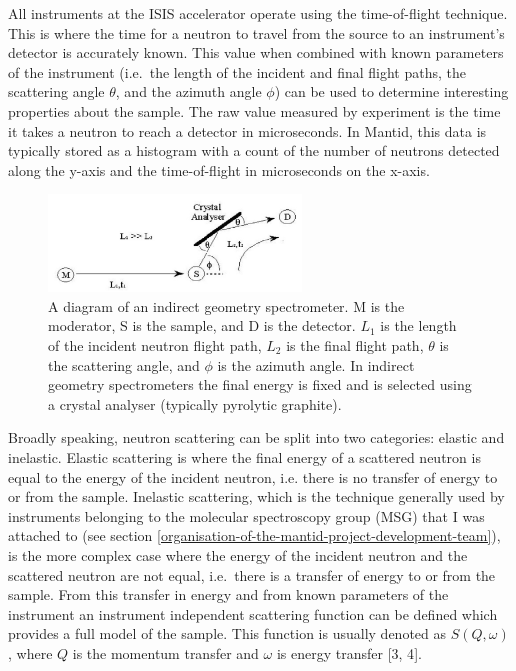 \documentclass[paper=a4, fontsize=11pt]{scrartcl}	%
\numberwithin{equation}{section}															%
\numberwithin{figure}{section}																%
\numberwithin{table}{section}
\begin{document}
All instruments at the ISIS accelerator operate using the time-of-flight
technique. This is where the time for a neutron to travel from the
source to an instrument's detector is accurately known. This value when
combined with known parameters of the instrument (i.e.~the length of the
incident and final flight paths, the scattering angle $\theta$, and the
azimuth angle $\phi$) can be used to determine interesting properties
about the sample. The raw value measured by experiment is the time it
takes a neutron to reach a detector in microseconds. In Mantid, this
data is typically stored as a histogram with a count of the number of
neutrons detected along the y-axis and the time-of-flight in
microseconds on the x-axis.

\begin{figure}[H]
\centering
\includegraphics[width=0.6\textwidth]{img/instrument-diagram.png}
\caption{A diagram of an indirect geometry spectrometer. M is the moderator, S is the sample, and D is the detector. $L_1$ is the length of the incident neutron flight path, $L_2$ is the final flight path, $\theta$ is the scattering angle, and $\phi$ is the azimuth angle. In indirect geometry spectrometers the final energy is fixed and is selected using a crystal analyser (typically pyrolytic graphite).}
\label{fig:instrument-diagram}
\end{figure}

Broadly speaking, neutron scattering can be split into two categories:
elastic and inelastic. Elastic scattering is where the final energy of a
scattered neutron is equal to the energy of the incident neutron,
i.e. there is no transfer of energy to or from the sample. Inelastic
scattering, which is the technique generally used by instruments
belonging to the molecular spectroscopy group (MSG) that I was attached to (see section \ref{organisation-of-the-mantid-project-development-team}),
is the more complex case where the energy of the incident neutron and
the scattered neutron are not equal, i.e.~there is a transfer of energy
to or from the sample. From this transfer in energy and from known
parameters of the instrument an instrument independent scattering
function can be defined which provides a full model of the sample. This
function is usually denoted as $S(Q,\omega)$, where $Q$ is the momentum
transfer and $\omega$ is energy transfer {[}3, 4{]}.
\end{document}

